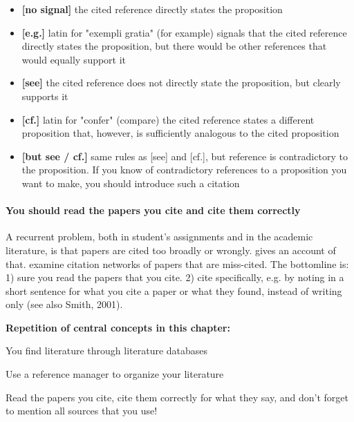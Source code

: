 \documentclass{tufte-book}
\begin{document}
\begin{itemize}
  \item \textbf{[no signal]} the cited reference directly states the proposition
  \item \textbf{[e.g.]} latin for "exempli gratia" (for example) signals that the cited reference directly states the proposition, but there would be other references that would equally support it
  \item \textbf{[see]} the cited reference does not directly state the proposition, but clearly supports it
  \item \textbf{[cf.]} latin for "confer" (compare) the cited reference states a different proposition that, however, is sufficiently analogous to the cited proposition
  \item \textbf{[but see / cf.]} same rules as [see] and [cf.], but reference is contradictory to the proposition. If you know of contradictory references to a proposition you want to make, you should introduce such a citation
\end{itemize}

\paragraph{You should read the papers you cite and cite them correctly} A recurrent problem, both in student's assignments and in the academic literature, is that papers are cited too broadly or wrongly. \citet{Editorial-Causecorrelationconjecture-2015} gives an account of that. \citet{Greenberg-Howcitationdistortions-2009} examine citation networks of papers that are miss-cited. The bottomline is: 1) sure you read the papers that you cite. 2) cite specifically, e.g. by noting in a short sentence for what you cite a paper or what they found, instead of writing only (see also Smith, 2001).

\vspace{1cm}
\begin{mdframed}[backgroundcolor=black!10,rightline=false,leftline=false]

\textbf{Repetition of central concepts in this chapter:}

\begin{itemize*}
  \item You find literature through literature databases
  \item Use a reference manager to organize your literature
  \item Read the papers you cite, cite them correctly for what they say, and don't forget to mention all sources that you use!
\end{itemize*}

\end{mdframed}
\end{document}
